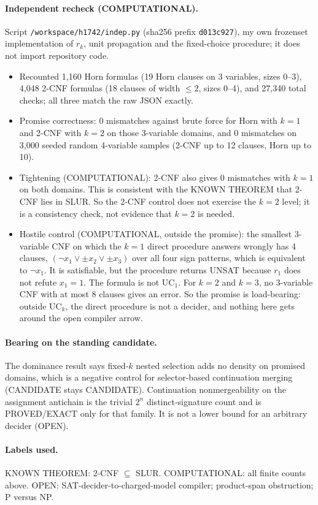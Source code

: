 \documentclass[11pt]{article}
\begin{document}
\paragraph{Independent recheck (COMPUTATIONAL).} Script \texttt{/workspace/h1742/indep.py} (sha256 prefix \texttt{d013c927}), my own frozenset implementation of $r_k$, unit propagation and the fixed-choice procedure; it does not import repository code.
\begin{itemize}
\item Recounted 1{,}160 Horn formulas (19 Horn clauses on 3 variables, sizes 0--3), 4{,}048 2-CNF formulas (18 clauses of width $\le 2$, sizes 0--4), and 27{,}340 total checks; all three match the raw JSON exactly.
\item Promise correctness: 0 mismatches against brute force for Horn with $k=1$ and 2-CNF with $k=2$ on those 3-variable domains, and 0 mismatches on 3{,}000 seeded random 4-variable samples (2-CNF up to 12 clauses, Horn up to 10).
\item Tightening (COMPUTATIONAL): 2-CNF also gives 0 mismatches with $k=1$ on both domains. This is consistent with the KNOWN THEOREM that 2-CNF lies in SLUR. So the 2-CNF control does not exercise the $k=2$ level; it is a consistency check, not evidence that $k=2$ is needed.
\item Hostile control (COMPUTATIONAL, outside the promise): the smallest 3-variable CNF on which the $k=1$ direct procedure answers wrongly has 4 clauses, $(\neg x_1\vee\pm x_2\vee\pm x_3)$ over all four sign patterns, which is equivalent to $\neg x_1$. It is satisfiable, but the procedure returns UNSAT because $r_1$ does not refute $x_1=1$. The formula is not UC$_1$. For $k=2$ and $k=3$, no 3-variable CNF with at most 8 clauses gives an error. So the promise is load-bearing: outside UC$_k$, the direct procedure is not a decider, and nothing here gets around the open compiler arrow.
\end{itemize}

\paragraph{Bearing on the standing candidate.} The dominance result says fixed-$k$ nested selection adds no density on promised domains, which is a negative control for selector-based continuation merging (CANDIDATE stays CANDIDATE). Continuation nonmergeability on the assignment antichain is the trivial $2^n$ distinct-signature count and is PROVED/EXACT only for that family. It is not a lower bound for an arbitrary decider (OPEN).

\paragraph{Labels used.} KNOWN THEOREM: 2-CNF $\subseteq$ SLUR. COMPUTATIONAL: all finite counts above. OPEN: SAT-decider-to-charged-model compiler; product-span obstruction; P versus NP.
\end{document}
